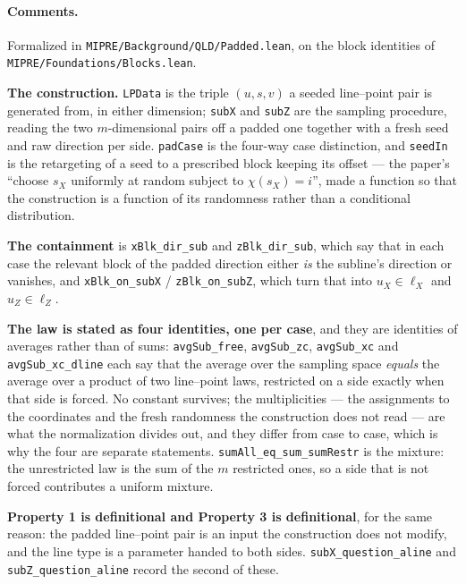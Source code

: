 \paragraph{Comments.} Formalized in \texttt{MIPRE/Background/QLD/Padded.lean}, on the block
identities of \texttt{MIPRE/Foundations/Blocks.lean}.

\textbf{The construction.} \texttt{LPData} is the triple $(u, s, v)$ a seeded line--point pair is
generated from, in either dimension; \texttt{subX} and \texttt{subZ} are the sampling procedure,
reading the two $m$-dimensional pairs off a padded one together with a fresh seed and raw direction
per side. \texttt{padCase} is the four-way case distinction, and \texttt{seedIn} is the retargeting
of a seed to a prescribed block keeping its offset --- the paper's ``choose $s_X$ uniformly at
random subject to $\chi(s_X) = i$'', made a function so that the construction is a function of its
randomness rather than a conditional distribution.

\textbf{The containment} is \texttt{xBlk\_dir\_sub} and \texttt{zBlk\_dir\_sub}, which say that in
each case the relevant block of the padded direction either \emph{is} the subline's direction or
vanishes, and \texttt{xBlk\_on\_subX} / \texttt{zBlk\_on\_subZ}, which turn that into
$u_X \in \ell_X$ and $u_Z \in \ell_Z$.

\textbf{The law is stated as four identities, one per case}, and they are identities of averages
rather than of sums: \texttt{avgSub\_free}, \texttt{avgSub\_zc}, \texttt{avgSub\_xc} and
\texttt{avgSub\_xc\_dline} each say that the average over the sampling space \emph{equals} the
average over a product of two line--point laws, restricted on a side exactly when that side is
forced. No constant survives; the multiplicities --- the assignments to the coordinates and the
fresh randomness the construction does not read --- are what the normalization divides out, and
they differ from case to case, which is why the four are separate statements.
\texttt{sumAll\_eq\_sum\_sumRestr} is the mixture: the unrestricted law is the sum of the $m$
restricted ones, so a side that is not forced contributes a uniform mixture.

\textbf{Property 1 is definitional and Property 3 is definitional}, for the same reason: the padded
line--point pair is an input the construction does not modify, and the line type is a parameter
handed to both sides. \texttt{subX\_question\_aline} and \texttt{subZ\_question\_aline} record the
second of these.

